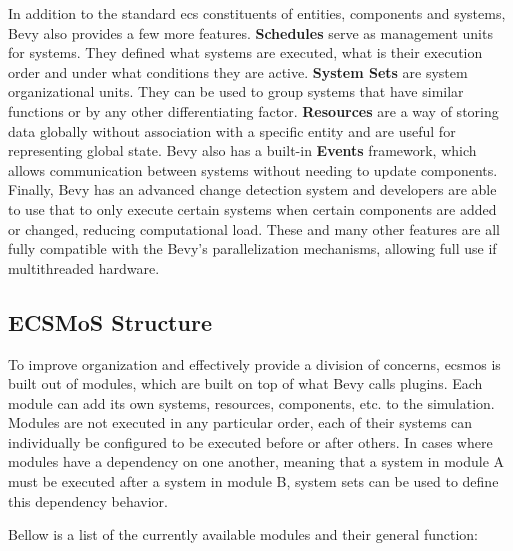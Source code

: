\documentclass[twoside, 11pt]{article}
\begin{document}
In addition to the standard \gls{ecs} constituents of entities, components and systems, Bevy also provides a few more features. \textbf{Schedules} serve as management units for systems. They defined what systems are executed, what is their execution order and under what conditions they are active. \textbf{System Sets} are system organizational units. They can be used to group systems that have similar functions or by any other differentiating factor. \textbf{Resources} are a way of storing data globally without association with a specific entity and are useful for representing global state. Bevy also has a built-in \textbf{Events} framework, which allows communication between systems without needing to update components. Finally, Bevy has an advanced change detection system and developers are able to use that to only execute certain systems when certain components are added or changed, reducing computational load. These and many other features are all fully compatible with the Bevy's parallelization mechanisms, allowing full use if multithreaded hardware.

\subsection{ECSMoS Structure}

To improve organization and effectively provide a division of concerns, \gls{ecsmos} is built out of modules, which are built on top of what Bevy calls plugins. Each module can add its own systems, resources, components, etc. to the simulation. Modules are not executed in any particular order, each of their systems can individually be configured to be executed before or after others. In cases where modules have a dependency on one another, meaning that a system in module A must be executed after a system in module B, system sets can be used to define this dependency behavior.

Bellow is a list of the currently available modules and their general function:
\end{document}
